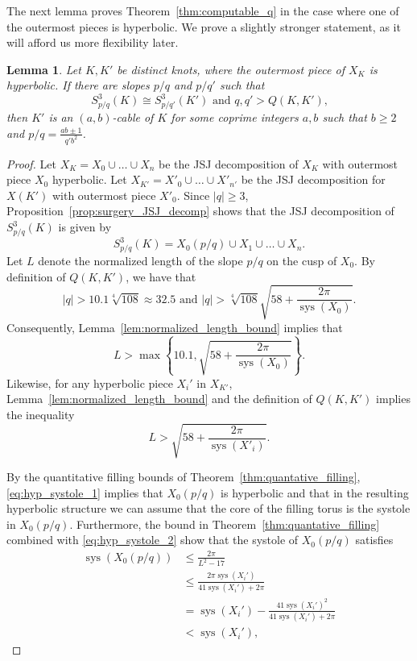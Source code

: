 \documentclass{amsart} %
\DeclareMathOperator{\sys}{sys}
\theoremstyle{thm}
\newtheorem{lem}[Theorem]{Lemma}
\theoremstyle{definition}
\numberwithin{equation}{section}
\begin{document}
The next lemma proves Theorem~\ref{thm:computable_q} in the case where one of the outermost pieces is hyperbolic. We prove a slightly stronger statement, as it will afford us more flexibility later.

\begin{lem}\label{lem:hyp_case}
Let $K, K'$ be distinct knots, where the outermost piece of $X_K$ is hyperbolic. If there are slopes $p/q$ and $p/q'$ such that
\[
\text{$S_{p/q}^3(K)\cong S_{p/q'}^3(K')$ and $q,q'> Q(K, K')$,}
\]
then $K'$ is an $(a,b)$-cable of $K$ for some coprime integers $a,b$ such that $b\geq 2$ and $p/q = \frac{ab\pm 1}{q'b^2}$.
\end{lem}
\begin{proof}
Let $X_K=X_0 \cup \dots \cup X_n$ be the JSJ decomposition of $X_K$ with outermost piece $X_0$ hyperbolic. Let $X_{K'}=X'_0 \cup \dots \cup X'_{n'}$ be the JSJ decomposition for $X(K')$ with outermost piece $X'_0$. Since $|q|\geq 3$, Proposition~\ref{prop:surgery_JSJ_decomp} shows that the JSJ decomposition of $S_{p/q}^3(K)$ is given by
\[
S_{p/q}^3(K)=X_0(p/q) \cup X_1\cup \dots \cup X_n.
\]
 Let $L$ denote the normalized length of the slope $p/q$ on the cusp of $X_0$. By definition of $Q(K,K')$, we have that
 \[
 \text{$|q|> 10.1\sqrt[4]{108}\approx 32.5$ and $|q|> \sqrt[4]{108}\sqrt{58+ \frac{2\pi}{\sys(X_0)}}$}.
 \]
Consequently, Lemma~\ref{lem:normalized_length_bound} implies that
 \begin{equation}\label{eq:hyp_systole_1}
 L>\max \left\{10.1, \sqrt{58+ \frac{2\pi}{\sys(X_0)}} \right\}. 
 \end{equation}
Likewise, for any hyperbolic piece $X_i'$ in $X_{K'}$, Lemma~\ref{lem:normalized_length_bound} and the definition of $Q(K,K')$ implies the inequality
\begin{equation}\label{eq:hyp_systole_2}
 L> \sqrt{58+ \frac{2\pi}{\sys(X'_i)}}. 
 \end{equation}
 
By the quantitative filling bounds of Theorem~\ref{thm:quantative_filling}, \eqref{eq:hyp_systole_1} implies that $X_0(p/q)$ is hyperbolic and that in the resulting hyperbolic structure we can assume that the core of the filling torus is the systole in $X_0(p/q)$. Furthermore, the bound in Theorem~\ref{thm:quantative_filling} combined with \eqref{eq:hyp_systole_2} show that the systole of $X_0(p/q)$ satisfies
\begin{align*}
\sys(X_0(p/q))&\leq \frac{2\pi}{L^2 -17} \\ 
&\leq \frac{2\pi \sys(X_i')}{41\sys(X_i') + 2\pi}\\
&= \sys(X_i') - \frac{41\sys(X_i')^2}{41\sys(X_i')+2\pi}\\
&<\sys(X_i'),
\end{align*}


\end{proof}
\end{document}
